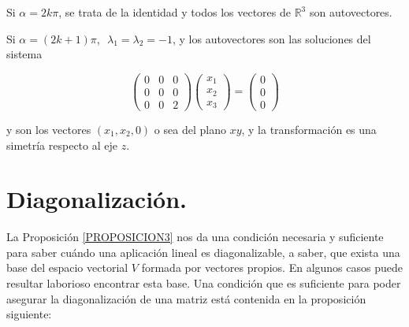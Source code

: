 \begin{example}
\bigskip

Si $ \alpha = 2k \pi $, se trata de la identidad y todos los vectores de $ \mathbb{R}^3$ son autovectores.

\bigskip

Si $ \alpha = (2k+1) \pi $, $ $ $\lambda_1=\lambda_2= -1$, y los autovectores son las soluciones del sistema 

\bigskip

$$\left(\begin{array}{ccc} 0 & 0&  0 \\ 0 & 0 & 0
\\ 0 & 0 & 2
\end{array}
 \right)  \left(\begin{array}{c} x_1\\ x_2
\\ x_3
\end{array}
 \right) =  \left(\begin{array}{c} 0\\ 0
\\ 0
\end{array}
 \right)$$
 
\bigskip
\noindent
y son los vectores  $ (x_1, x_2,0)$ o sea del plano $xy$, y la transformación es una simetría respecto al eje $z$.

\end{example}

\bigskip



\section{Diagonalización.}
\label{diago}

La Proposición \ref{PROPOSICION3} nos da una condición necesaria y suficiente para saber cuándo una aplicación lineal es diagonalizable, a saber, que exista una base del espacio vectorial $V$ formada por vectores propios. En algunos casos puede resultar laborioso encontrar esta base. Una condición que es suficiente para poder asegurar la diagonalización de una matriz está contenida en la proposición siguiente:



\bigskip


